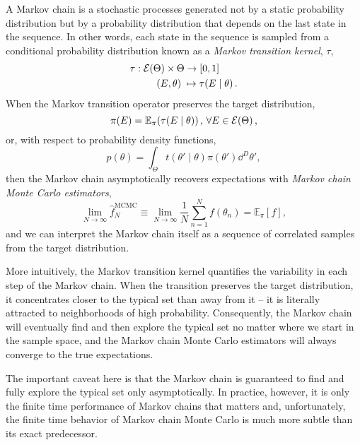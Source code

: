 A Markov chain is a stochastic processes generated not by a
static probability distribution but by a probability distribution 
that depends on the last state in the sequence.  In other words, 
each state in the sequence is sampled from a conditional 
probability distribution known as a \emph{Markov transition 
kernel}, $\tau$, 
%
\begin{align*}
\tau
&:  \mathcal{E} \! \left( \Theta \right)  \times \Theta \rightarrow \left[0, 1 \right] \\
&\quad\quad \left( E, \theta \right) \; \mapsto 
\tau \! \left( E \mid \theta \right).
\end{align*}
%
When the Markov transition operator preserves the target
distribution,
%
\begin{equation*}
\pi \! \left( E \right)
=
\mathbb{E}_{\pi} \! 
\left( \tau \! \left( E \mid \theta \right) \right), \, \forall E \in  \mathcal{E} \! \left( \Theta \right) ,
\end{equation*}
%
or, with respect to probability density functions,
%
\begin{equation*}
p \! \left( \theta \right)
=
\int_{\Theta} t \! \left( \theta' \mid \theta \right) 
\pi \! \left( \theta' \right) \dd^{D} \theta',
\end{equation*}
%
then the Markov chain asymptotically recovers expectations
with \emph{Markov chain Monte Carlo estimators},
%
\begin{equation*}
\lim_{N \rightarrow \infty} 
\hat{f}^{\mathrm{MCMC}}_{N}
\equiv
\lim_{N \rightarrow \infty} 
\frac{1}{N} \sum_{n = 1}^{N} f \! \left( \theta_{n} \right)
=
\mathbb{E}_{\pi} \! \left[ f \right],
\end{equation*}
%
and we can interpret the Markov chain itself as a sequence
of correlated samples from the target distribution.

More intuitively, the Markov transition kernel quantifies
the variability in each step of the Markov chain.  When the
transition preserves the target distribution, it  concentrates 
closer to the typical set than away from it -- it is literally 
attracted to neighborhoods of high probability.  Consequently, 
the Markov chain will eventually find and then explore the
typical set no matter where we start in the sample space,
and the Markov chain Monte Carlo estimators will always
converge to the true expectations.
 
The important caveat here is that the Markov chain is 
guaranteed to find and fully explore the typical set only 
asymptotically.  In practice, however, it is only the finite time 
performance of Markov chains that matters and, unfortunately, 
the finite time behavior of Markov chain Monte Carlo is much 
more subtle than its exact predecessor.

